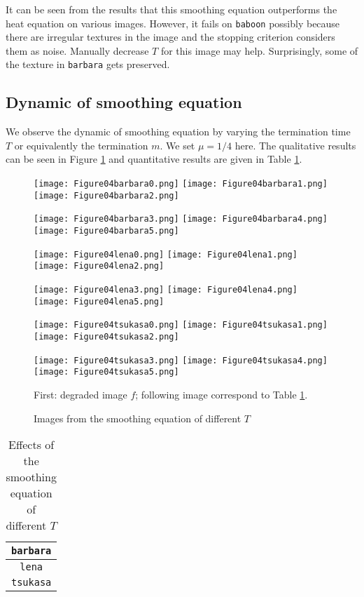 \documentclass[english, nochinese]{pnote}
\begin{document}
It can be seen from the results that this smoothing equation outperforms the heat equation on various images. However, it fails on \verb"baboon" possibly because there are irregular textures in the image and the stopping criterion considers them as noise. Manually decrease $T$ for this image may help. Surprisingly, some of the texture in \verb"barbara" gets preserved.

\subsection{Dynamic of smoothing equation}

We observe the dynamic of smoothing equation by varying the termination time $T$ or equivalently the termination $m$. We set $ \mu = 1 / 4 $ here. The qualitative results can be seen in Figure \ref{Fig:SmoothDyn} and quantitative results are given in Table \ref{Tbl:SmoothDyn}.

\begin{figure}[htbp]
{
\centering

\texttt{[image: Figure04barbara0.png]}
\texttt{[image: Figure04barbara1.png]}
\texttt{[image: Figure04barbara2.png]}

\texttt{[image: Figure04barbara3.png]}
\texttt{[image: Figure04barbara4.png]}
\texttt{[image: Figure04barbara5.png]}

\texttt{[image: Figure04lena0.png]}
\texttt{[image: Figure04lena1.png]}
\texttt{[image: Figure04lena2.png]}

\texttt{[image: Figure04lena3.png]}
\texttt{[image: Figure04lena4.png]}
\texttt{[image: Figure04lena5.png]}

\texttt{[image: Figure04tsukasa0.png]}
\texttt{[image: Figure04tsukasa1.png]}
\texttt{[image: Figure04tsukasa2.png]}

\texttt{[image: Figure04tsukasa3.png]}
\texttt{[image: Figure04tsukasa4.png]}
\texttt{[image: Figure04tsukasa5.png]}

\caption{Images from the smoothing equation of different $T$}
\label{Fig:SmoothDyn}
}
{
\footnotesize First: degraded image $f$; following image correspond to Table \ref{Tbl:SmoothDyn}.
}
\end{figure}

\begin{table}[htbp]
\centering
\begin{tabular}{|c|c|c|c|c|c|c|}
\hline
\multicolumn{7}{|c|}{\texttt{barbara}} \\
\hline

\multicolumn{7}{|c|}{\texttt{lena}} \\
\hline

\multicolumn{7}{|c|}{\texttt{tsukasa}} \\
\hline

\end{tabular}
\caption{Effects of the smoothing equation of different $T$}
\label{Tbl:SmoothDyn}
\end{table}
\end{document}

